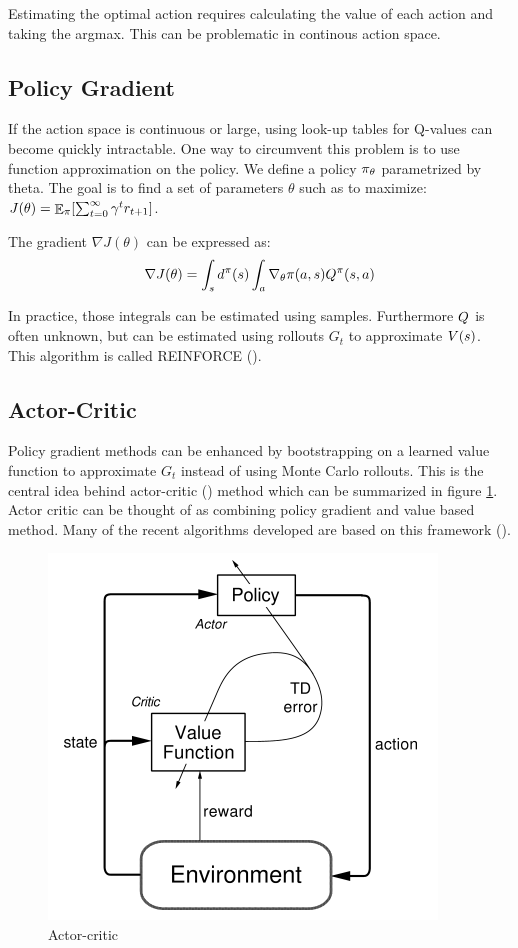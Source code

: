 Estimating the optimal action requires calculating the value of each action and taking the argmax. This can be problematic in continous action space.


\subsection{Policy Gradient}
If the action space is continuous or large, using look-up tables for Q-values can become quickly intractable. One way to circumvent this problem is to use function approximation on the policy. We define a policy $\pi_{\theta}$ parametrized by theta. The goal is to find a set of parameters $\theta$ such as to maximize: $J(\theta)=\mathop{\mathbb{E}}_{\pi}[\sum_{t=0}^{\infty} \gamma^t r_{t+1}]$. 
\begin{definition}
The gradient $\nabla J(\theta)$ can be expressed as:
\begin{equation}
    \nabla J(\theta) = \int_s d^{\pi}(s) \int_a \nabla_{\theta} \pi(a,s)Q^{\pi}(s,a)
\end{equation}
\end{definition}
In practice, those integrals can be estimated using samples. Furthermore $Q$ is often unknown, but can be estimated using rollouts $G_t$ to approximate $V(s)$. This algorithm is called REINFORCE (\cite{williams1995gradient}).

\subsection{Actor-Critic}
Policy gradient methods can be enhanced by bootstrapping on a learned value function to approximate $G_t$ instead of using Monte Carlo rollouts. This is the central idea behind actor-critic (\cite{konda2000actor}) method which can be summarized in figure \ref{fig:actor_critic}. Actor critic can be thought of as combining policy gradient and value based method. Many of the recent algorithms developed are based on this framework (\cite{mnih2016asynchronous,schulman2017proximal,wu2017scalable}).
\begin{figure}
    \centering
    \includegraphics[scale=0.6]{fig/actor_critic.png}
    \caption{Actor-critic}
    \label{fig:actor_critic}
\end{figure}
